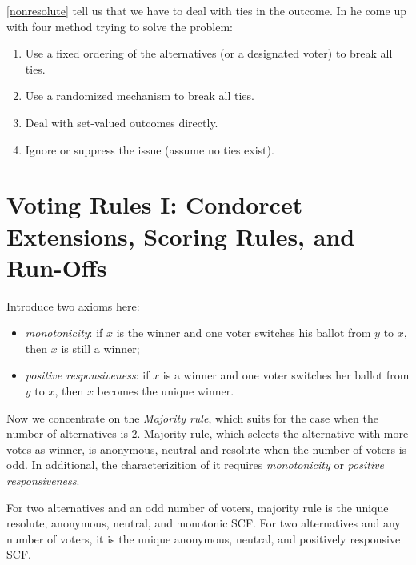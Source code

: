 \cref{nonresolute} tell us that we have to deal with ties in the outcome. In \cite{moulinHandbookComputationalSocial2016} he come up with four method trying to solve the problem:

\begin{enumerate}
    \item Use a fixed ordering of the alternatives (or a designated voter) to break all ties.
    \item Use a randomized mechanism to break all ties.
    \item Deal with set-valued outcomes directly.
    \item Ignore or suppress the issue (assume no ties exist).
\end{enumerate}

\section{Voting Rules I: Condorcet Extensions, Scoring Rules, and Run-Offs}\label{voting_rules_I}

Introduce two axioms here:\\

\begin{definition}
    \begin{itemize}
        \item \textit{monotonicity}: if $x$ is the winner and one voter switches his ballot from $y$ to $x$, then $x$ is still a winner; 
        \item \textit{positive responsiveness}: if $x$ is a winner and one voter switches her ballot from $y$ to $x$, then $x$ becomes the unique winner.
    \end{itemize}
\end{definition}

Now we concentrate on the \textit{Majority rule}, which suits for the case when the number of alternatives is $2$. Majority rule, which selects the alternative with more votes as winner, is anonymous, neutral and resolute when the number of voters is odd. In additional, the characterizition of it requires \textit{monotonicity} or \textit{positive responsiveness}.

\begin{proposition}
    \label{ThMay}
    For two alternatives and an odd number of voters, majority rule is the unique resolute, anonymous, neutral, and monotonic SCF. For two alternatives and any number of voters, it is the unique anonymous, neutral, and positively responsive SCF.
\end{proposition}

